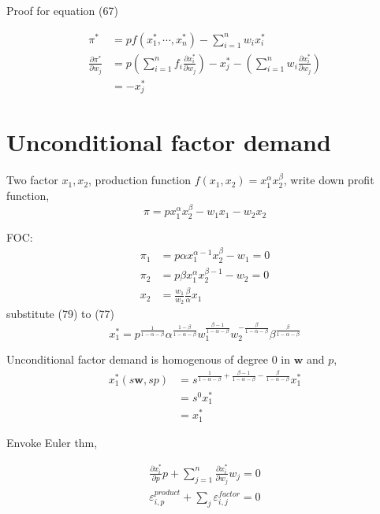 \documentclass[12pt]{article}
\begin{document}
Proof for equation (67)


\begin{align}
				\pi ^{*} &= pf(x_1^{*},\cdots,x_{n}^{*}) - \sum\limits_{i = 1} ^n
				w_{i}x_{i}^{*}\\
				\frac{\partial \pi ^{*} }{\partial w_{j} }
				 &= p \left( \sum\limits_{i = 1} ^n f_{i}
				 \frac{\partial x_{i}^{*} }{\partial w_{j} }\right)  - 
				x_{j}^{*} - \left( \sum\limits_{i = 1} ^n w_{i}
				\frac{\partial x_{i}^{*} }{\partial w_{j}  }\right) \\
				 &=  - x_{j}^{*}
\end{align}





\section{Unconditional factor demand}

Two factor $ x_1, x_2 $, production function $ f(x_1,x_2) = x_1^{\alpha }
x_2^{\beta }$, write down profit function,
\begin{equation}
				\pi = px_1^{\alpha }x_2^{\beta } - w_1x_1 - w_2x_2
\end{equation}

FOC:
\begin{align}
				\pi_1 &= p \alpha x_1^{\alpha  - 1}x_2^{\beta } - w_1 = 0\\
				\pi_2 &= p \beta x_1^{\alpha }x_2^{\beta  - 1} - w_2 = 0\\
				x_2 &= \frac{w_1}{w_2}\frac{\beta}{\alpha }x_1
\end{align}
substitute (79) to (77)
\begin{equation}
				x_1^{*} = p^{\frac{1}{1 - \alpha  - \beta }}\alpha ^{\frac{1 - \beta }{
				1 - \alpha  - \beta }}w_1^{\frac{\beta  - 1}{1 - \alpha  - \beta }}
				w_2^{-\frac{\beta}{1 - \alpha  - \beta }}\beta ^{\frac{\beta}{1 -
				\alpha  - \beta }}
\end{equation}

Unconditional factor demand is homogenous of degree 0 in $ \bm{w} $ and $ p $,
\begin{align}
				x_1^{*}(s \bm{w},sp) &= 
				s^{\frac{1}{1 - \alpha  - \beta } + \frac{\beta  - 1}{1 - \alpha  - 
				\beta }  -\frac{\beta}{1 - \alpha  - \beta }}x_1^{*}\\
				 &= s^{0}x_1^{*}\\
				 &= x_1^{*}
\end{align}

Envoke Euler thm,

\begin{align}
				\frac{\partial x_{i}^{*} }{\partial p }p 
				+ \sum\limits_{j = 1} ^n \frac{\partial x_{i}^{*} }{\partial w_{j} }w_{j}
				=0\\
				\varepsilon _{i,p}^{product} + \sum\limits_{j} \varepsilon _{i,j}^{
				factor} = 0
\end{align}
\end{document}
